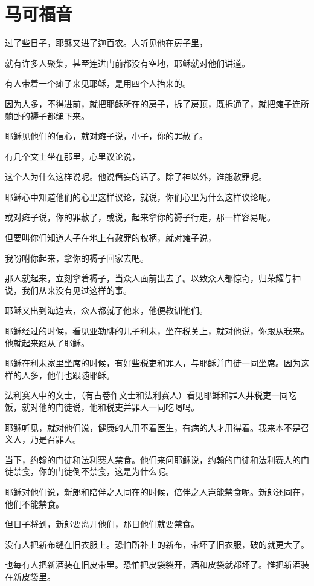 \documentclass[12pt,oneside]{book}
\begin{document}
\chapter{马可福音}
过了些日子，耶稣又进了迦百农。人听见他在房子里，

就有许多人聚集，甚至连进门前都没有空地，耶稣就对他们讲道。

有人带着一个瘫子来见耶稣，是用四个人抬来的。

因为人多，不得进前，就把耶稣所在的房子，拆了房顶，既拆通了，就把瘫子连所躺卧的褥子都缒下来。

耶稣见他们的信心，就对瘫子说，小子，你的罪赦了。

有几个文士坐在那里，心里议论说，

这个人为什么这样说呢。他说僭妄的话了。除了神以外，谁能赦罪呢。

耶稣心中知道他们的心里这样议论，就说，你们心里为什么这样议论呢。

或对瘫子说，你的罪赦了，或说，起来拿你的褥子行走，那一样容易呢。

但要叫你们知道人子在地上有赦罪的权柄，就对瘫子说，

我吩咐你起来，拿你的褥子回家去吧。

那人就起来，立刻拿着褥子，当众人面前出去了。以致众人都惊奇，归荣耀与神说，我们从来没有见过这样的事。

耶稣又出到海边去，众人都就了他来，他便教训他们。

耶稣经过的时候，看见亚勒腓的儿子利未，坐在税关上，就对他说，你跟从我来。他就起来跟从了耶稣。

耶稣在利未家里坐席的时候，有好些税吏和罪人，与耶稣并门徒一同坐席。因为这样的人多，他们也跟随耶稣。

法利赛人中的文士，（有古卷作文士和法利赛人）看见耶稣和罪人并税吏一同吃饭，就对他的门徒说，他和税吏并罪人一同吃喝吗。

耶稣听见，就对他们说，健康的人用不着医生，有病的人才用得着。我来本不是召义人，乃是召罪人。

当下，约翰的门徒和法利赛人禁食。他们来问耶稣说，约翰的门徒和法利赛人的门徒禁食，你的门徒倒不禁食，这是为什么呢。

耶稣对他们说，新郎和陪伴之人同在的时候，倍伴之人岂能禁食呢。新郎还同在，他们不能禁食。

但日子将到，新郎要离开他们，那日他们就要禁食。

没有人把新布缝在旧衣服上。恐怕所补上的新布，带坏了旧衣服，破的就更大了。

也每有人把新酒装在旧皮带里。恐怕把皮袋裂开，酒和皮袋就都坏了。惟把新酒装在新皮袋里。
\end{document}
